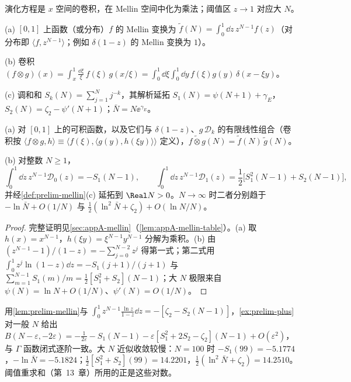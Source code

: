 演化方程是 $x$ 空间的卷积，在 Mellin 空间中化为乘法；阈值区 $z\to1$ 对应大 $N$。

\begin{definition}\label{def:prelim-mellin}
(a) $[0,1]$ 上函数（或分布）$f$ 的 Mellin 变换为 $\tilde f(N)=\int_0^1\dd z\,z^{N-1}f(z)$（对分布即 $\langle f,z^{N-1}\rangle$；例如 $\delta(1-z)$ 的 Mellin 变换为 $1$）。
\par
(b) 卷积 $(f\otimes g)(x)=\int_x^1\frac{\dd\xi}{\xi}\,f(\xi)\,g(x/\xi)=\int_0^1\!\dd\xi\int_0^1\!\dd y\,f(\xi)g(y)\,\delta(x-\xi y)$。
\par
(c) 调和和 $S_k(N)=\sum_{j=1}^Nj^{-k}$，其解析延拓 $S_1(N)=\psi(N+1)+\gamma_E$，$S_2(N)=\zeta_2-\psi'(N+1)$；$\bar N=N\ee^{\gamma_E}$。%
\end{definition}

\begin{lemma}\label{lem:prelim-mellin}
(a) 对 $[0,1]$ 上的可积函数，以及它们与 $\delta(1-z)$、$g\,\mathcal D_k$ 的有限线性组合（卷积按 $\langle f\otimes g,h\rangle\equiv\langle f(\xi),\langle g(y),h(\xi y)\rangle\rangle$ 定义），$\widetilde{f\otimes g}(N)=\tilde f(N)\,\tilde g(N)$。
\par
(b) 对整数 $N\ge1$，
\begin{equation}\label{eq:prelim-mellin-D}
\int_0^1\dd z\,z^{N-1}\mathcal D_0(z)=-S_1(N-1),\qquad \int_0^1\dd z\,z^{N-1}\mathcal D_1(z)=\frac12\big[S_1^2(N-1)+S_2(N-1)\big], %
\end{equation}
并经\cref{def:prelim-mellin}(c) 延拓到 $\Real N>0$。$N\to\infty$ 时二者分别趋于 $-\ln\bar N+O(1/N)$ 与 $\frac12(\ln^2\bar N+\zeta_2)+O(\ln N/N)$。
\end{lemma}

\begin{proof}
完整证明见\cref{sec:appA-mellin}（\cref{lem:appA-mellin-table}）。(a) 取 $h(x)=x^{N-1}$，$h(\xi y)=\xi^{N-1}y^{N-1}$ 分解为乘积。(b) 由 $(z^{N-1}-1)/(1-z)=-\sum_{j=0}^{N-2}z^j$ 得第一式；第二式用 $\int_0^1z^j\ln(1-z)\dd z=-S_1(j+1)/(j+1)$ 与 $\sum_{m=1}^{N-1}S_1(m)/m=\frac12[S_1^2+S_2](N-1)$；大 $N$ 极限来自 $\psi(N)=\ln N+O(1/N)$、$\psi'(N)=O(1/N)$。
\end{proof}

用\cref{lem:prelim-mellin}与 $\int_0^1z^{N-1}\frac{\ln z}{1-z}\dd z=-[\zeta_2-S_2(N-1)]$，\cref{ex:prelim-plus}对一般 $N$ 给出 $B(N-\varepsilon,-2\varepsilon)=-\frac1{2\varepsilon}-S_1(N-1)-\varepsilon[S_1^2+2S_2-\zeta_2](N-1)+O(\varepsilon^2)$，与 $\Gamma$ 函数闭式逐阶一致。大 $N$ 近似收敛较慢：$N=100$ 时 $-S_1(99)=-5.1774$，$-\ln\bar N=-5.1824$；$\frac12[S_1^2+S_2](99)=14.2201$，$\frac12(\ln^2\bar N+\zeta_2)=14.2510$。阈值重求和（第~13~章）所用的正是这些对数。

